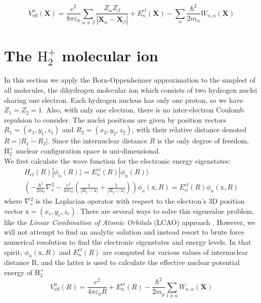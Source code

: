 \documentclass[11pt,a4paper]{article}
\begin{document}
\begin{equation}
	\label{eq:Effective nuclear potential energy}
	V_{\text{eff}}^n(\mathbf{X}) = \frac{e^2}{8\pi\varepsilon_0} \sum_{\alpha \neq \beta} \frac{Z_\alpha Z_\beta}{|\mathbf{X}_\alpha - \mathbf{X}_\beta|} + E_n^{el}(\mathbf{X}) - \sum_\alpha \frac{\hbar^2}{2m_\alpha} W_{n,\alpha}(\mathbf{X})
\end{equation}

\section{The $\text{H}_2^+$ molecular ion}
In this section we apply the Born-Oppenheimer approximation to the simplest of all molecules, the dihydrogen molecular ion which consists of two hydrogen nuclei sharing one electron. Each hydrogen nucleus has only one proton, so we have $Z_1 = Z_2 = 1$. Also, with only one electron, there is no inter-electron Coulomb repulsion to consider. The nuclei positions are given by position vectors $R_1=(x_1,y_1,z_1)$ and $R_2=(x_2,y_2,z_2)$, with their relative distance denoted $R=|R_1-R_2|$. Since the internuclear distance $R$ is the only degree of freedom,  $\text{H}_2^+$ nuclear configuration space is uni-dimensional.\\
We first calculate the wave function for the electronic energy eigenstates:
\begin{equation*}
	\begin{gathered}
		H_{el}(R) |\phi_n(R)\rangle = E_n^{el}(R) |\phi_n(R)\rangle \\[6pt]
		\left( -\frac{\hbar^2}{2m_e} \nabla_e^2 - \frac{e^2}{4\pi\varepsilon_0} \left( \frac{1}{|R_1 - \mathrm{x}|} + \frac{1}{|R_2 - \mathrm{x}|} \right) \right) \phi_n(\mathrm{x}, R) = E_n^{el}(R) \phi_n(\mathrm{x}, R)
	\end{gathered}
\end{equation*}
where $\nabla_e^2$ is the Laplacian operator with respect to the electron’s 3D position vector $\mathrm{x} = (x_e,y_e,z_e)$. There are several ways to solve this eigenvalue problem, like the \emph{Linear Combination of Atomic Orbitals} (LCAO) approach \cite{SzaboOstlund}. However, we will not attempt to find an analytic solution and instead resort to brute force numerical resolution to find the electronic eigenstates and energy levels. In that spirit, $\phi_n(\mathrm{x}, R)$ and $E_n^{el}(R)$ are computed for various values of internuclear distance R, and the latter is used to calculate the effective nuclear potential energy of $\text{H}_2^+$
\begin{equation*}
	V_{\text{eff}}^n(R) = \frac{e^2}{4\pi\varepsilon_0 R} + E_n^{el}(R) - \frac{\hbar^2}{2m_p} \sum_{l \neq n} W_{n,\alpha}(\mathbf{X})
\end{equation*}
\end{document}
